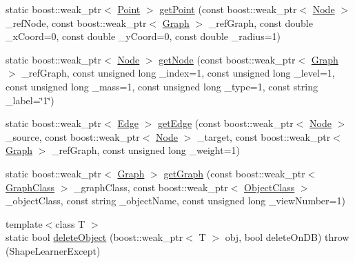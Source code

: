 \begin{DoxyCompactItemize}
static boost\+::weak\+\_\+ptr$<$ \hyperlink{class_point}{Point} $>$ \hyperlink{class_graph_manager_1_1_common_interface_af13939409f17a9f85e0b0b80f1f3bd54}{get\+Point} (const boost\+::weak\+\_\+ptr$<$ \hyperlink{class_node}{Node} $>$ \+\_\+ref\+Node, const boost\+::weak\+\_\+ptr$<$ \hyperlink{class_graph}{Graph} $>$ \+\_\+ref\+Graph, const double \+\_\+x\+Coord=0, const double \+\_\+y\+Coord=0, const double \+\_\+radius=1)
\item 
static boost\+::weak\+\_\+ptr$<$ \hyperlink{class_node}{Node} $>$ \hyperlink{class_graph_manager_1_1_common_interface_a2ef9441b4b6e49d9911004475c2a21b2}{get\+Node} (const boost\+::weak\+\_\+ptr$<$ \hyperlink{class_graph}{Graph} $>$ \+\_\+ref\+Graph, const unsigned long \+\_\+index=1, const unsigned long \+\_\+level=1, const unsigned long \+\_\+mass=1, const unsigned long \+\_\+type=1, const string \+\_\+label=\char`\"{}1\char`\"{})
\item 
static boost\+::weak\+\_\+ptr$<$ \hyperlink{class_edge}{Edge} $>$ \hyperlink{class_graph_manager_1_1_common_interface_af83bcbb37bfdfe161a13ad6a7a4339a6}{get\+Edge} (const boost\+::weak\+\_\+ptr$<$ \hyperlink{class_node}{Node} $>$ \+\_\+source, const boost\+::weak\+\_\+ptr$<$ \hyperlink{class_node}{Node} $>$ \+\_\+target, const boost\+::weak\+\_\+ptr$<$ \hyperlink{class_graph}{Graph} $>$ \+\_\+ref\+Graph, const unsigned long \+\_\+weight=1)
\item 
static boost\+::weak\+\_\+ptr$<$ \hyperlink{class_graph}{Graph} $>$ \hyperlink{class_graph_manager_1_1_common_interface_a853c0a5031599e40a30acd8449c301f2}{get\+Graph} (const boost\+::weak\+\_\+ptr$<$ \hyperlink{class_graph_class}{Graph\+Class} $>$ \+\_\+graph\+Class, const boost\+::weak\+\_\+ptr$<$ \hyperlink{class_object_class}{Object\+Class} $>$ \+\_\+object\+Class, const string \+\_\+object\+Name, const unsigned long \+\_\+view\+Number=1)
\item 
{\footnotesize template$<$class T $>$ }\\static bool \hyperlink{class_graph_manager_1_1_common_interface_a8d037b726f45ef6c154aa23213a5efc5}{delete\+Object} (boost\+::weak\+\_\+ptr$<$ T $>$ obj, bool delete\+On\+D\+B)  throw (\+Shape\+Learner\+Except)
\end{DoxyCompactItemize}
